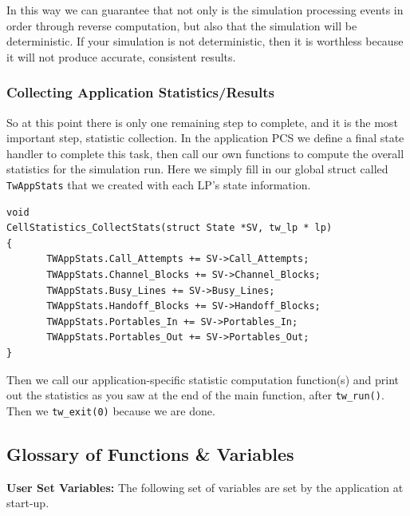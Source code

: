 \documentclass[12pt]{article}
\begin{document}
In this way we can guarantee that not only is the simulation
processing events in order through reverse computation, but also that
the simulation will be deterministic.  If your simulation is not
deterministic, then it is worthless because it will not produce
accurate, consistent results.
 
\subsubsection{Collecting Application Statistics/Results}
So at this point there is only one remaining step to complete, and it
is the most important step, statistic collection.  In the application
PCS we define a final state handler to complete this task, then
call our own functions to compute the overall statistics for the
simulation run.  Here we simply fill in our global struct called
{\tt TwAppStats} that we created with each LP's state information.

\begin{verbatim}
void
CellStatistics_CollectStats(struct State *SV, tw_lp * lp)
{
       TWAppStats.Call_Attempts += SV->Call_Attempts;
       TWAppStats.Channel_Blocks += SV->Channel_Blocks;
       TWAppStats.Busy_Lines += SV->Busy_Lines;
       TWAppStats.Handoff_Blocks += SV->Handoff_Blocks;
       TWAppStats.Portables_In += SV->Portables_In;
       TWAppStats.Portables_Out += SV->Portables_Out;
}
\end{verbatim}
 
Then we call our application-specific statistic computation
function(s) and print out the statistics as you saw at the end of the
main function, after {\tt tw\_run()}. Then we {\tt tw\_exit(0)} because
we are done.

\subsection{Glossary of Functions \& Variables}

{\bf User Set Variables:} The following set of variables are set by the
application at start-up.
\end{document}

